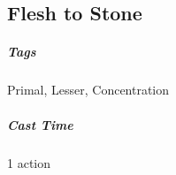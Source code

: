 
















\subsection{Flesh to Stone}\label{spell:flesh-to-stone}
\subparagraph*{Tags} Primal, Lesser, Concentration
\subparagraph*{Cast Time} 1 action

